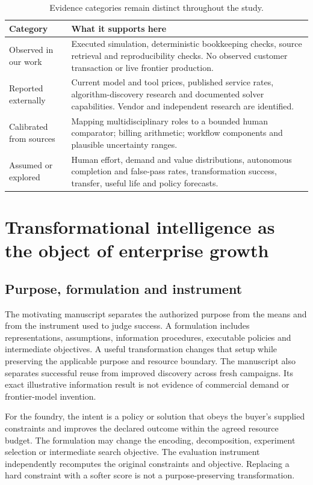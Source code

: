 \documentclass[11pt,a4paper]{article}
\begin{document}
\begin{table}[!htbp]\centering\small
\caption{Evidence categories remain distinct throughout the study.}
\begin{tabularx}{\linewidth}{p{.22\linewidth}Y}\toprule
Category & What it supports here\\\midrule
Observed in our work & Executed simulation, deterministic bookkeeping checks, source retrieval and reproducibility checks. No observed customer transaction or live frontier production.\\
Reported externally & Current model and tool prices, published service rates, algorithm-discovery research and documented solver capabilities. Vendor and independent research are identified.\\
Calibrated from sources & Mapping multidisciplinary roles to a bounded human comparator; billing arithmetic; workflow components and plausible uncertainty ranges.\\
Assumed or explored & Human effort, demand and value distributions, autonomous completion and false-pass rates, transformation success, transfer, useful life and policy forecasts.\\\bottomrule
\end{tabularx}\end{table}

\section{Transformational intelligence as the object of enterprise growth}

\subsection{Purpose, formulation and instrument}

The motivating manuscript separates the authorized purpose from the means and from the instrument used to judge success. A formulation includes representations, assumptions, information procedures, executable policies and intermediate objectives. A useful transformation changes that setup while preserving the applicable purpose and resource boundary. The manuscript also separates successful reuse from improved discovery across fresh campaigns. Its exact illustrative information result is not evidence of commercial demand or frontier-model invention.\cite{TI}

For the foundry, the intent is a policy or solution that obeys the buyer's supplied constraints and improves the declared outcome within the agreed resource budget. The formulation may change the encoding, decomposition, experiment selection or intermediate search objective. The evaluation instrument independently recomputes the original constraints and objective. Replacing a hard constraint with a softer score is not a purpose-preserving transformation.
\end{document}
